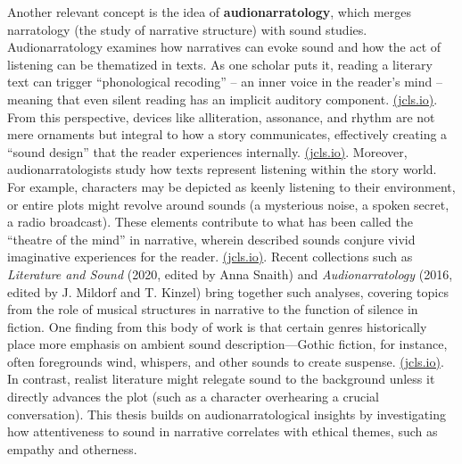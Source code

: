 \documentclass[12pt]{report}
\begin{document}
Another relevant concept is the idea of \textbf{audionarratology}, which merges narratology (the study of narrative structure) with sound studies. Audionarratology examines how narratives can evoke sound and how the act of listening can be thematized in texts. As one scholar puts it, reading a literary text can trigger “phonological recoding” – an inner voice in the reader’s mind – meaning that even silent reading has an implicit auditory component. \href{https://jcls.io/article/id/3583/#:~:text=recitation%20of%20literary%20texts%2C%20where,of%20reading%20whether%20aloud%20or}{(jcls.io)}. From this perspective, devices like alliteration, assonance, and rhythm are not mere ornaments but integral to how a story communicates, effectively creating a “sound design” that the reader experiences internally. \href{https://jcls.io/article/id/3583/#:~:text=approach%20to%20sound%20in%20literature,31}{(jcls.io)}. Moreover, audionarratologists study how texts represent listening within the story world. For example, characters may be depicted as keenly listening to their environment, or entire plots might revolve around sounds (a mysterious noise, a spoken secret, a radio broadcast). These elements contribute to what has been called the “theatre of the mind” in narrative, wherein described sounds conjure vivid imaginative experiences for the reader. \href{https://jcls.io/article/id/3583/#:~:text=There%20have%20been%20numerous%20recent,33%20Snaith}{(jcls.io)}. Recent collections such as \textit{Literature and Sound} (2020, edited by Anna Snaith) and \textit{Audionarratology} (2016, edited by J. Mildorf and T. Kinzel) bring together such analyses, covering topics from the role of musical structures in narrative to the function of silence in fiction. One finding from this body of work is that certain genres historically place more emphasis on ambient sound description—Gothic fiction, for instance, often foregrounds wind, whispers, and other sounds to create suspense. \href{https://jcls.io/article/id/3583/#:~:text=There%20have%20been%20numerous%20recent,33%20Snaith}{(jcls.io)}. In contrast, realist literature might relegate sound to the background unless it directly advances the plot (such as a character overhearing a crucial conversation). This thesis builds on audionarratological insights by investigating how attentiveness to sound in narrative correlates with ethical themes, such as empathy and otherness.
\end{document}
